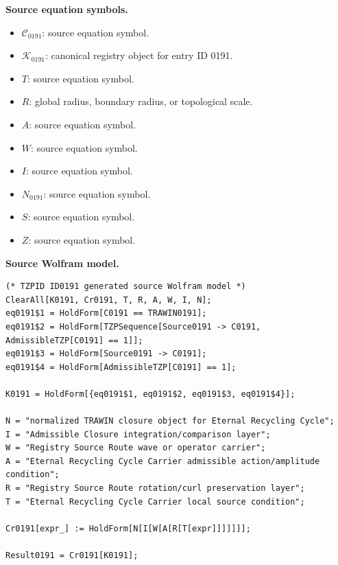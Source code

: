 \begin{minipage}[t]{0.49\linewidth}
\begingroup
\small
\raggedright
\textbf{Source equation symbols.}\par
\begin{itemize}[leftmargin=1.35em,itemsep=1pt,topsep=1pt,parsep=0pt]
    \item $\mathcal{C}_{0191}$: source equation symbol.
    \item $\mathcal{K}_{0191}$: canonical registry object for entry ID 0191.
    \item $T$: source equation symbol.
    \item $R$: global radius, boundary radius, or topological scale.
    \item $A$: source equation symbol.
    \item $W$: source equation symbol.
    \item $I$: source equation symbol.
    \item $N_{0191}$: source equation symbol.
    \item $S$: source equation symbol.
    \item $Z$: source equation symbol.
\end{itemize}
\endgroup
\end{minipage}\hfill
\begin{minipage}[t]{0.47\linewidth}
\begingroup
\scriptsize
\raggedright
\textbf{Source Wolfram model.}\par
\begin{Verbatim}[fontsize=\tiny,breaklines=true,breakanywhere=true]
(* TZPID ID0191 generated source Wolfram model *)
ClearAll[K0191, Cr0191, T, R, A, W, I, N];
eq0191$1 = HoldForm[C0191 == TRAWIN0191];
eq0191$2 = HoldForm[TZPSequence[Source0191 -> C0191, AdmissibleTZP[C0191] == 1]];
eq0191$3 = HoldForm[Source0191 -> C0191];
eq0191$4 = HoldForm[AdmissibleTZP[C0191] == 1];

K0191 = HoldForm[{eq0191$1, eq0191$2, eq0191$3, eq0191$4}];

N = "normalized TRAWIN closure object for Eternal Recycling Cycle";
I = "Admissible Closure integration/comparison layer";
W = "Registry Source Route wave or operator carrier";
A = "Eternal Recycling Cycle Carrier admissible action/amplitude condition";
R = "Registry Source Route rotation/curl preservation layer";
T = "Eternal Recycling Cycle Carrier local source condition";

Cr0191[expr_] := HoldForm[N[I[W[A[R[T[expr]]]]]]];

Result0191 = Cr0191[K0191];
\end{Verbatim}
\endgroup
\end{minipage}


